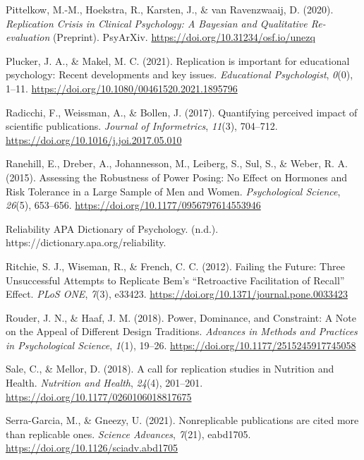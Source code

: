 \documentclass[
  english,
  jou,floatsintext]{apa6}
\newlength{\cslhangindent}
\newenvironment{cslreferences}%
  {\setlength{\parindent}{0pt}%
  \everypar{\setlength{\hangindent}{\cslhangindent}}\ignorespaces}%
  {\par}
\begin{document}
\begin{cslreferences}
\leavevmode\hypertarget{ref-Pittelkow2020}{}%
Pittelkow, M.-M., Hoekstra, R., Karsten, J., \& van Ravenzwaaij, D. (2020). \emph{Replication Crisis in Clinical Psychology: A Bayesian and Qualitative Re-evaluation} (Preprint). PsyArXiv. \url{https://doi.org/10.31234/osf.io/unezq}

\leavevmode\hypertarget{ref-Plucker2021}{}%
Plucker, J. A., \& Makel, M. C. (2021). Replication is important for educational psychology: Recent developments and key issues. \emph{Educational Psychologist}, \emph{0}(0), 1--11. \url{https://doi.org/10.1080/00461520.2021.1895796}

\leavevmode\hypertarget{ref-Radicchi2017}{}%
Radicchi, F., Weissman, A., \& Bollen, J. (2017). Quantifying perceived impact of scientific publications. \emph{Journal of Informetrics}, \emph{11}(3), 704--712. \url{https://doi.org/10.1016/j.joi.2017.05.010}

\leavevmode\hypertarget{ref-Ranehill2015}{}%
Ranehill, E., Dreber, A., Johannesson, M., Leiberg, S., Sul, S., \& Weber, R. A. (2015). Assessing the Robustness of Power Posing: No Effect on Hormones and Risk Tolerance in a Large Sample of Men and Women. \emph{Psychological Science}, \emph{26}(5), 653--656. \url{https://doi.org/10.1177/0956797614553946}

\leavevmode\hypertarget{ref-zotero-3730}{}%
Reliability APA Dictionary of Psychology. (n.d.). https://dictionary.apa.org/reliability.

\leavevmode\hypertarget{ref-Ritchie2012}{}%
Ritchie, S. J., Wiseman, R., \& French, C. C. (2012). Failing the Future: Three Unsuccessful Attempts to Replicate Bem's ``Retroactive Facilitation of Recall'' Effect. \emph{PLoS ONE}, \emph{7}(3), e33423. \url{https://doi.org/10.1371/journal.pone.0033423}

\leavevmode\hypertarget{ref-Rouder2018}{}%
Rouder, J. N., \& Haaf, J. M. (2018). Power, Dominance, and Constraint: A Note on the Appeal of Different Design Traditions. \emph{Advances in Methods and Practices in Psychological Science}, \emph{1}(1), 19--26. \url{https://doi.org/10.1177/2515245917745058}

\leavevmode\hypertarget{ref-Sale2018}{}%
Sale, C., \& Mellor, D. (2018). A call for replication studies in Nutrition and Health. \emph{Nutrition and Health}, \emph{24}(4), 201--201. \url{https://doi.org/10.1177/0260106018817675}

\leavevmode\hypertarget{ref-Serra-Garcia2021}{}%
Serra-Garcia, M., \& Gneezy, U. (2021). Nonreplicable publications are cited more than replicable ones. \emph{Science Advances}, \emph{7}(21), eabd1705. \url{https://doi.org/10.1126/sciadv.abd1705}


\end{cslreferences}
\end{document}
